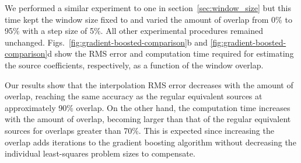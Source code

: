 We performed a similar experiment to one in section~\ref{sec:window_size} but
this time kept the window size fixed to \BoostOverlappingWindowSize{} and
varied the amount of overlap from 0\% to 95\% with a step size of 5\%.
All other experimental procedures remained unchanged.
Figs.~\ref{fig:gradient-boosted-comparison}b and
\ref{fig:gradient-boosted-comparison}d show the RMS error and computation time
required for estimating the source coefficients, respectively, as a function of
the window overlap.

Our results show that the interpolation RMS error decreases with the amount of
overlap, reaching the same accuracy as the regular equivalent sources at
approximately 90\% overlap.
On the other hand, the computation time increases with the amount of overlap,
becoming larger than that of the regular equivalent sources for overlaps
greater than 70\%.
This is expected since increasing the overlap adds iterations to the gradient
boosting algorithm without decreasing the individual least-squares problem
sizes to compensate.

